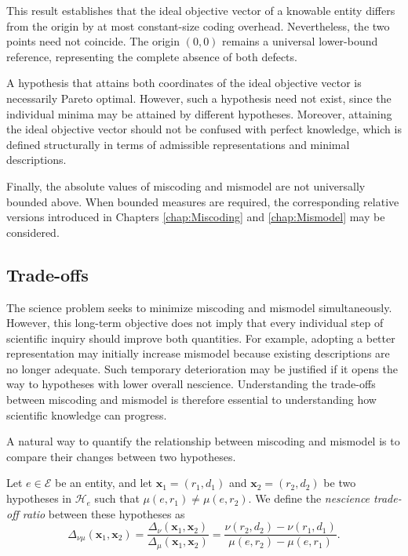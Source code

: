 This result establishes that the ideal objective vector of a knowable entity differs from the origin by at most constant-size coding overhead. Nevertheless, the two points need not coincide. The origin $(0,0)$ remains a universal lower-bound reference, representing the complete absence of both defects.

A hypothesis that attains both coordinates of the ideal objective vector is necessarily Pareto optimal. However,
such a hypothesis need not exist, since the individual minima may be attained by different hypotheses. Moreover, attaining the ideal objective vector should not be confused with perfect knowledge, which is defined structurally in terms of admissible representations and minimal descriptions.

Finally, the absolute values of miscoding and mismodel are not universally bounded above. When bounded measures are required, the corresponding relative versions introduced in Chapters \ref{chap:Miscoding} and \ref{chap:Mismodel} may be considered.


\subsection*{Trade-offs}
\label{sec:nescience_tradeoffs}

The science problem seeks to minimize miscoding and mismodel simultaneously. However, this long-term objective does not imply that every individual step of scientific inquiry should improve both quantities. For example, adopting a better representation may initially increase mismodel because existing descriptions are no longer adequate. Such temporary deterioration may be justified if it opens the way to hypotheses with lower overall nescience. Understanding the trade-offs between miscoding and mismodel is therefore essential to understanding how scientific knowledge can progress.

A natural way to quantify the relationship between miscoding and mismodel is to compare their changes between two hypotheses.

\begin{definition}
Let $e\in\mathcal E$ be an entity, and let $\mathbf{x}_1=(r_1,d_1)$ and $\mathbf{x}_2=(r_2,d_2)$ be two hypotheses in $\mathcal H_e$ such that $\mu(e,r_1)\neq\mu(e,r_2)$. We define the \emph{nescience trade-off ratio}  between these hypotheses as
\[
\Delta_{\nu\mu}(\mathbf{x}_1,\mathbf{x}_2) = \frac{\Delta_\nu(\mathbf{x}_1,\mathbf{x}_2)}{\Delta_\mu(\mathbf{x}_1,\mathbf{x}_2)} 
= \frac{\nu(r_2,d_2)-\nu(r_1,d_1)} {\mu(e,r_2)-\mu(e,r_1)}.
\]
\end{definition}

